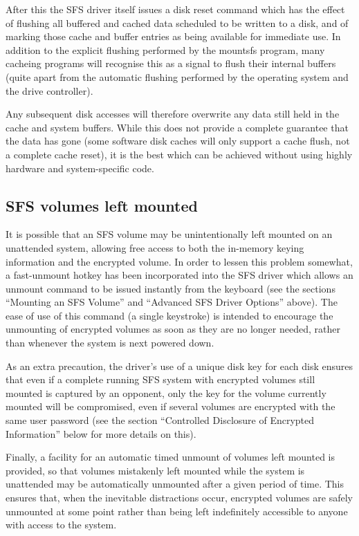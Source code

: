 After this the SFS driver itself issues a disk reset command which has the
effect of flushing all buffered and cached data scheduled to be written to a
disk, and of marking those cache and buffer entries as being available for
immediate use.  In addition to the explicit flushing performed by the mountsfs
program, many cacheing programs will recognise this as a signal to flush their
internal buffers (quite apart from the automatic flushing performed by the
operating system and the drive controller).

Any subsequent disk accesses will therefore overwrite any data still held in
the cache and system buffers.  While this does not provide a complete guarantee
that the data has gone (some software disk caches will only support a cache
flush, not a complete cache reset), it is the best which can be achieved
without using highly hardware and system-specific code.


\subsection{SFS volumes left mounted}

It is possible that an SFS volume may be unintentionally left mounted on an
unattended system, allowing free access to both the in-memory keying
information and the encrypted volume.  In order to lessen this problem
somewhat, a fast-unmount hotkey has been incorporated into the SFS driver which
allows an unmount command to be issued instantly from the keyboard (see the
sections ``Mounting an SFS Volume'' and ``Advanced SFS Driver Options'' above).
The ease of use of this command (a single keystroke) is intended to encourage
the unmounting of encrypted volumes as soon as they are no longer needed,
rather than whenever the system is next powered down.

As an extra precaution, the driver's use of a unique disk key for each disk
ensures that even if a complete running SFS system with encrypted volumes still 
mounted is captured by an opponent, only the key for the volume currently
mounted will be compromised, even if several volumes are encrypted with the
same user password (see the section ``Controlled Disclosure of Encrypted
Information'' below for more details on this).

Finally, a facility for an automatic timed unmount of volumes left mounted is
provided, so that volumes mistakenly left mounted while the system is
unattended may be automatically unmounted after a given period of time.  This
ensures that, when the inevitable distractions occur, encrypted volumes are
safely unmounted at some point rather than being left indefinitely accessible
to anyone with access to the system.


